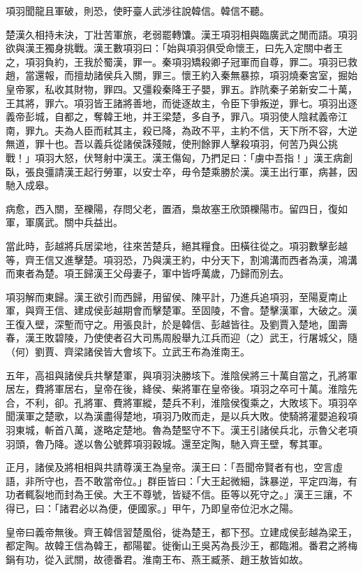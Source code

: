 \begin{pinyinscope}
項羽聞龍且軍破，則恐，使盱臺人武涉往說韓信。韓信不聽。

楚漢久相持未決，丁壯苦軍旅，老弱罷轉馕。漢王項羽相與臨廣武之閒而語。項羽欲與漢王獨身挑戰。漢王數項羽曰：「始與項羽俱受命懷王，曰先入定關中者王之，項羽負約，王我於蜀漢，罪一。秦項羽矯殺卿子冠軍而自尊，罪二。項羽已救趙，當還報，而擅劫諸侯兵入關，罪三。懷王約入秦無暴掠，項羽燒秦宮室，掘始皇帝冢，私收其財物，罪四。又彊殺秦降王子嬰，罪五。詐阬秦子弟新安二十萬，王其將，罪六。項羽皆王諸將善地，而徙逐故主，令臣下爭叛逆，罪七。項羽出逐義帝彭城，自都之，奪韓王地，并王梁楚，多自予，罪八。項羽使人陰弒義帝江南，罪九。夫為人臣而弒其主，殺已降，為政不平，主約不信，天下所不容，大逆無道，罪十也。吾以義兵從諸侯誅殘賊，使刑餘罪人擊殺項羽，何苦乃與公挑戰！」項羽大怒，伏弩射中漢王。漢王傷匈，乃捫足曰：「虜中吾指！」漢王病創臥，張良彊請漢王起行勞軍，以安士卒，毋令楚乘勝於漢。漢王出行軍，病甚，因馳入成皋。

病愈，西入關，至櫟陽，存問父老，置酒，梟故塞王欣頭櫟陽市。留四日，復如軍，軍廣武。關中兵益出。

當此時，彭越將兵居梁地，往來苦楚兵，絕其糧食。田橫往從之。項羽數擊彭越等，齊王信又進擊楚。項羽恐，乃與漢王約，中分天下，割鴻溝而西者為漢，鴻溝而東者為楚。項王歸漢王父母妻子，軍中皆呼萬歲，乃歸而別去。

項羽解而東歸。漢王欲引而西歸，用留侯、陳平計，乃進兵追項羽，至陽夏南止軍，與齊王信、建成侯彭越期會而擊楚軍。至固陵，不會。楚擊漢軍，大破之。漢王復入壁，深塹而守之。用張良計，於是韓信、彭越皆往。及劉賈入楚地，圍壽春，漢王敗碧陵，乃使使者召大司馬周殷舉九江兵而迎（之）武王，行屠城父，隨（何）劉賈、齊梁諸侯皆大會垓下。立武王布為淮南王。

五年，高祖與諸侯兵共擊楚軍，與項羽決勝垓下。淮陰侯將三十萬自當之，孔將軍居左，費將軍居右，皇帝在後，絳侯、柴將軍在皇帝後。項羽之卒可十萬。淮陰先合，不利，卻。孔將軍、費將軍縱，楚兵不利，淮陰侯復乘之，大敗垓下。項羽卒聞漢軍之楚歌，以為漢盡得楚地，項羽乃敗而走，是以兵大敗。使騎將灌嬰追殺項羽東城，斬首八萬，遂略定楚地。魯為楚堅守不下。漢王引諸侯兵北，示魯父老項羽頭，魯乃降。遂以魯公號葬項羽穀城。還至定陶，馳入齊王壁，奪其軍。

正月，諸侯及將相相與共請尊漢王為皇帝。漢王曰：「吾聞帝賢者有也，空言虛語，非所守也，吾不敢當帝位。」群臣皆曰：「大王起微細，誅暴逆，平定四海，有功者輒裂地而封為王侯。大王不尊號，皆疑不信。臣等以死守之。」漢王三讓，不得已，曰：「諸君必以為便，便國家。」甲午，乃即皇帝位汜水之陽。

皇帝曰義帝無後。齊王韓信習楚風俗，徙為楚王，都下邳。立建成侯彭越為梁王，都定陶。故韓王信為韓王，都陽翟。徙衡山王吳芮為長沙王，都臨湘。番君之將梅鋗有功，從入武關，故德番君。淮南王布、燕王臧荼、趙王敖皆如故。


\end{pinyinscope}

